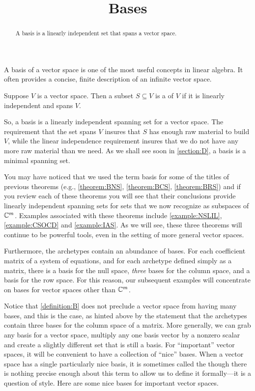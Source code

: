 \documentclass{ximera}
\title{Bases}
\begin{document}
\begin{abstract}
  A basis is a linearly independent set that spans a vector space.
\end{abstract}
\maketitle

A basis of a vector space is one of the most useful concepts in linear
algebra.  It often provides a concise, finite description of an
infinite vector space.

\begin{definition}[Basis]
  \label{definition:B}
  Suppose $V$ is a vector space.  Then a subset $S\subseteq V$ is a
   of $V$ if it is linearly independent and spans $V$.
\end{definition}

So, a basis is a linearly independent spanning set for a vector space.
The requirement that the set spans $V$ insures that $S$ has enough raw
material to build $V$, while the linear independence requirement
insures that we do not have any more raw material than we need.  As we
shall see soon in \ref{section:D}, a basis is a minimal spanning set.

You may have noticed that we used the term basis for some of the
titles of previous theorems (e.g., \ref{theorem:BNS},
\ref{theorem:BCS}, \ref{theorem:BRS}) and if you review each of these
theorems you will see that their conclusions provide linearly
independent spanning sets for sets that we now recognize as subspaces
of $\mathbb{C}^{m}$.  Examples associated with these theorems include
\ref{example:NSLIL}, \ref{example:CSOCD} and \ref{example:IAS}.  As we
will see, these three theorems will continue to be powerful tools,
even in the setting of more general vector spaces.

Furthermore, the archetypes contain an abundance of bases.  For each
coefficient matrix of a system of equations, and for each archetype
defined simply as a matrix, there is a basis for the null space,
\textit{three} bases for the column space, and a basis for the row
space.  For this reason, our subsequent examples will concentrate on
bases for vector spaces other than $\mathbb{C}^{m}$.

Notice that \ref{definition:B} does not preclude a vector space from
having many bases, and this is the case, as hinted above by the
statement that the archetypes contain three bases for the column space
of a matrix.  More generally, we can grab any basis for a vector
space, multiply any one basis vector by a nonzero scalar and create a
slightly different set that is still a basis.  For ``important''
vector spaces, it will be convenient to have a collection of ``nice''
bases.  When a vector space has a single particularly nice basis, it
is sometimes called the  though there is nothing
precise enough about this term to allow us to define it formally---it
is a question of style.  Here are some nice bases for important vector
spaces.
\end{document}
